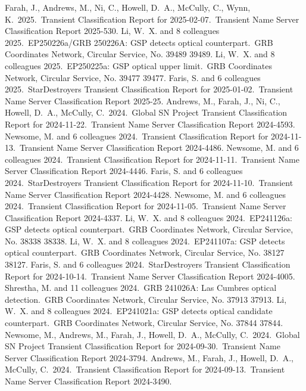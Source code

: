 \documentclass[margin,line]{res}
\begin{document}
\begin{resume}
 Farah, J., Andrews, M., Ni, C., Howell, D.~A., McCully, C., Wynn, K.\ 2025.\ Transient Classification Report for 2025-02-07.\ Transient Name Server Classification Report 2025-530.
 Li, W.~X. and 8 colleagues 2025.\ EP250226a/GRB 250226A: GSP detects optical counterpart.\ GRB Coordinates Network, Circular Service, No. 39489 39489.
 Li, W.~X. and 8 colleagues 2025.\ EP250225a: GSP optical upper limit.\ GRB Coordinates Network, Circular Service, No. 39477 39477.
 Faris, S. and 6 colleagues 2025.\ StarDestroyers Transient Classification Report for 2025-01-02.\ Transient Name Server Classification Report 2025-25.
 Andrews, M., Farah, J., Ni, C., Howell, D.~A., McCully, C.\ 2024.\ Global SN Project Transient Classification Report for 2024-11-22.\ Transient Name Server Classification Report 2024-4593.
 Newsome, M. and 6 colleagues 2024.\ Transient Classification Report for 2024-11-13.\ Transient Name Server Classification Report 2024-4486.
 Newsome, M. and 6 colleagues 2024.\ Transient Classification Report for 2024-11-11.\ Transient Name Server Classification Report 2024-4446.
 Faris, S. and 6 colleagues 2024.\ StarDestroyers Transient Classification Report for 2024-11-10.\ Transient Name Server Classification Report 2024-4428.
 Newsome, M. and 6 colleagues 2024.\ Transient Classification Report for 2024-11-05.\ Transient Name Server Classification Report 2024-4337.
 Li, W.~X. and 8 colleagues 2024.\ EP241126a: GSP detects optical counterpart.\ GRB Coordinates Network, Circular Service, No. 38338 38338.
 Li, W.~X. and 8 colleagues 2024.\ EP241107a: GSP detects optical counterpart.\ GRB Coordinates Network, Circular Service, No. 38127 38127.
 Faris, S. and 6 colleagues 2024.\ StarDestroyers Transient Classification Report for 2024-10-14.\ Transient Name Server Classification Report 2024-4005.
 Shrestha, M. and 11 colleagues 2024.\ GRB 241026A: Las Cumbres optical detection.\ GRB Coordinates Network, Circular Service, No. 37913 37913.
 Li, W.~X. and 8 colleagues 2024.\ EP241021a: GSP detects optical candidate counterpart.\ GRB Coordinates Network, Circular Service, No. 37844 37844.
 Newsome, M., Andrews, M., Farah, J., Howell, D.~A., McCully, C.\ 2024.\ Global SN Project Transient Classification Report for 2024-09-30.\ Transient Name Server Classification Report 2024-3794.
 Andrews, M., Farah, J., Howell, D.~A., McCully, C.\ 2024.\ Transient Classification Report for 2024-09-13.\ Transient Name Server Classification Report 2024-3490.


\end{resume}
\end{document}
